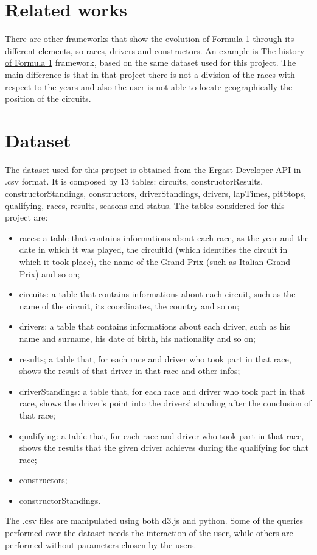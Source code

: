 \documentclass[10pt,twocolumn,letterpaper]{article}
\begin{document}
\section{Related works}
There are other frameworks that show the evolution of Formula 1 through its different elements, so races, drivers and constructors. An example is
\href{https://f1.bitmetric.nl/formula.html}{The history of Formula 1} framework, based on the same dataset used for this project. The main difference is that in that project
there is not a division of the races with respect to the years and also the user is not able to locate geographically the position of the circuits. 

\section{Dataset}
The dataset used for this project is obtained from the \href{http://ergast.com/mrd/}{Ergast Developer API} in .csv format. It is composed by 13 tables: circuits,
constructorResults, constructorStandings, constructors, driverStandings, drivers, lapTimes, pitStops, qualifying, races, results, seasons and status. The tables considered
for this project are:
\begin{itemize}
	\item races: a table that contains informations about each race, as the year and the date in which it was played, the circuitId (which identifies the circuit in which it took place), the name of the Grand Prix (such as Italian Grand Prix) and so on;
	\item circuits: a table that contains informations about each circuit, such as the name of the circuit, its coordinates, the country and so on;
	\item drivers: a table that contains informations about each driver, such as his name and surname, his date of birth, his nationality and so on;
	\item results; a table that, for each race and driver who took part in that race, shows the result of that driver in that race and other infos;
	\item driverStandings: a table that, for each race and driver who took part in that race, shows the driver's point into the drivers' standing after the conclusion of that
	race;
	\item qualifying: a table that, for each race and driver who took part in that race, shows the results that the given driver achieves during the qualifying for that race;
	\item constructors;
	\item constructorStandings. 
\end{itemize}
The .csv files are manipulated using both d3.js and python. Some of the queries performed over the dataset needs the interaction of the user, while others are performed
without parameters chosen by the users.
\end{document}
